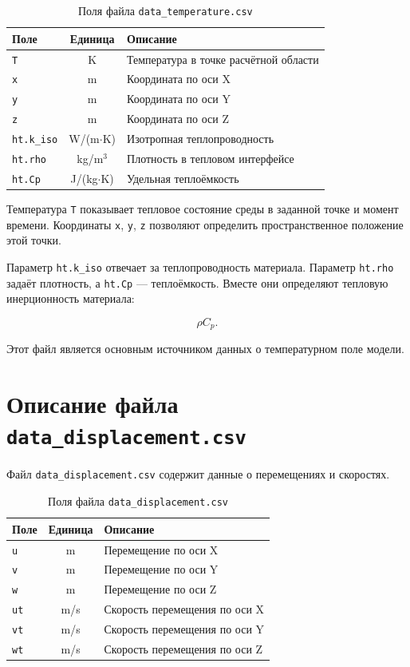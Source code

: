 \begin{table}[h!]
\centering
\caption{Поля файла \texttt{data\_temperature.csv}}
\label{tab:data_temperature}
\begin{tabular}{|l|c|p{8cm}|}
\hline
\textbf{Поле} & \textbf{Единица} & \textbf{Описание} \\
\hline
\texttt{T} & K & Температура в точке расчётной области \\
\hline
\texttt{x} & m & Координата по оси X \\
\hline
\texttt{y} & m & Координата по оси Y \\
\hline
\texttt{z} & m & Координата по оси Z \\
\hline
\texttt{ht.k\_iso} & W/(m$\cdot$K) & Изотропная теплопроводность \\
\hline
\texttt{ht.rho} & kg/m$^3$ & Плотность в тепловом интерфейсе \\
\hline
\texttt{ht.Cp} & J/(kg$\cdot$K) & Удельная теплоёмкость \\
\hline
\end{tabular}
\end{table}

Температура \texttt{T} показывает тепловое состояние среды в заданной точке и момент времени. Координаты \texttt{x}, \texttt{y}, \texttt{z} позволяют определить пространственное положение этой точки.

Параметр \texttt{ht.k\_iso} отвечает за теплопроводность материала. Параметр \texttt{ht.rho} задаёт плотность, а \texttt{ht.Cp} --- теплоёмкость. Вместе они определяют тепловую инерционность материала:

\begin{equation}
\rho C_p.
\end{equation}

Этот файл является основным источником данных о температурном поле модели.

\section{Описание файла \texttt{data\_displacement.csv}}

Файл \texttt{data\_displacement.csv} содержит данные о перемещениях и скоростях.

\begin{table}[h!]
\centering
\caption{Поля файла \texttt{data\_displacement.csv}}
\label{tab:data_displacement}
\begin{tabular}{|l|c|p{8cm}|}
\hline
\textbf{Поле} & \textbf{Единица} & \textbf{Описание} \\
\hline
\texttt{u} & m & Перемещение по оси X \\
\hline
\texttt{v} & m & Перемещение по оси Y \\
\hline
\texttt{w} & m & Перемещение по оси Z \\
\hline
\texttt{ut} & m/s & Скорость перемещения по оси X \\
\hline
\texttt{vt} & m/s & Скорость перемещения по оси Y \\
\hline
\texttt{wt} & m/s & Скорость перемещения по оси Z \\
\hline
\end{tabular}
\end{table}

